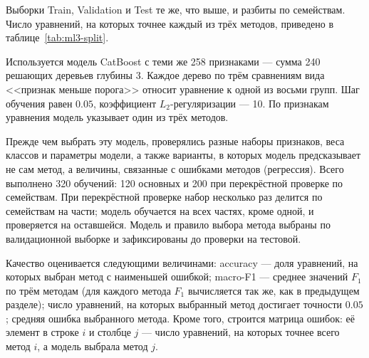 \documentclass[14pt,a4paper]{extarticle}
\begin{document}
Выборки Train, Validation и Test те же, что выше, и разбиты
по семействам. Число уравнений, на которых точнее каждый из трёх
методов, приведено в таблице~\ref{tab:ml3-split}.

\begin{table}[!htbp]
\centering
\caption{Число уравнений, на которых каждый из трёх методов даёт
наименьшую ошибку в точке $x=0$.}
\label{tab:ml3-split}
\end{table}

Используется модель CatBoost с теми же 258 признаками --- сумма
240 решающих деревьев глубины 3. Каждое дерево по трём сравнениям вида
<<признак меньше порога>> относит уравнение к одной из восьми групп.
Шаг обучения равен $0.05$, коэффициент $L_2$-регуляризации --- 10.
По признакам уравнения модель указывает один из трёх методов.

Прежде чем выбрать эту модель, проверялись разные наборы признаков,
веса классов и параметры модели, а также варианты, в которых модель
предсказывает не сам метод, а величины, связанные с ошибками методов
(регрессия). Всего выполнено 320 обучений: 120 основных и 200
при перекрёстной проверке по семействам. При перекрёстной проверке
набор несколько раз делится по семействам на части; модель обучается
на всех частях, кроме одной, и проверяется на оставшейся. Модель
и правило выбора метода выбраны по валидационной выборке и зафиксированы
до проверки на тестовой.

Качество оценивается следующими величинами: accuracy --- доля уравнений,
на которых выбран метод с наименьшей ошибкой; macro-F1 --- среднее
значений $F_1$ по трём методам (для каждого метода $F_1$ вычисляется так
же, как в предыдущем разделе); число уравнений, на которых выбранный
метод достигает точности $0.05$; средняя ошибка выбранного метода.
Кроме того, строится матрица ошибок: её элемент в строке $i$ и столбце
$j$ --- число уравнений, на которых точнее всего метод $i$, а модель
выбрала метод $j$.
\end{document}
